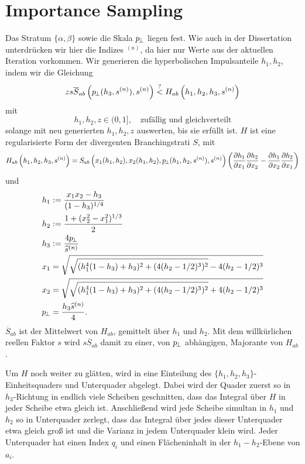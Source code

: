 \section{Importance Sampling}\label{sec:all:alg:imp}
Das Stratum $\{\alpha,\beta\}$ sowie die Skala $p_{\!\perp}$ liegen fest. Wie auch in der Dissertation unterdrücken wir hier die Indizes $^{(n)}$, da hier nur Werte aus der aktuellen Iteration vorkommen. Wir generieren die hyperbolischen Impulsanteile $h_1,h_2$, indem wir die Gleichung
\begin{equation}
  zs\overline{S}_{ab}\left(p_{\!\perp}(h_3,s^{(n)}),s^{(n)}\right)\overset{?}{<}H_{ab}\left(h_1,h_2,h_3,s^{(n)}\right)
\end{equation}
mit
\begin{equation}
  h_1,h_2,z\in(0,1],\quad \text{zufällig und gleichverteilt}
\end{equation}
solange mit neu generierten $h_1,h_2,z$ auswerten, bis sie erfüllt ist. $H$ ist eine regularisierte Form der divergenten Branchingstrati $S$, mit
\begin{equation}
  H_{ab}\left(h_1,h_2,h_3,s^{(n)}\right)=S_{ab}\left(x_1(h_1,h_2),x_2(h_1,h_2),p_{\!\perp}(h_1,h_2,s^{(n)}),s^{(n)}\right)\left(\frac{\partial h_1}{\partial x_1}\frac{\partial h_2}{\partial x_2}-\frac{\partial h_1}{\partial x_2}\frac{\partial h_2}{\partial x_1}\right)
\end{equation}
und
\begin{align}\label{eq:all:imp:trafo}
  h_1&:=\frac{x_1x_2 - h_3}{(1 - h_3)^{1/4}}\\
  h_2&:=\frac{1+(x_2^2 - x_1^2)^{1/3}}{2}\\
  h_3&:=\frac{4p_{\!\perp}}{\widehat{s}^{(n)}}\\
  x_1&=\sqrt{\sqrt{(h_1^4(1-h_3)+h_3)^2+(4(h_2-1/2)^3)^2}-4(h_2-1/2)^3}\\
  x_2&=\sqrt{\sqrt{(h_1^4(1-h_3)+h_3)^2+(4(h_2-1/2)^3)^2}+4(h_2-1/2)^3}\\
  p_{\!\perp}&=\frac{h_3\widehat{s}^{(n)}}{4}.
\end{align}
$\overline{S}_{ab}$ ist der Mittelwert von $H_{ab}$, gemittelt über $h_1$ und $h_2$. Mit dem willkürlichen reellen Faktor $s$ wird $s\overline{S}_{ab}$ damit zu einer, von $p_{\!\perp}$ abhängigen, Majorante von $H_{ab}$.

Um $H$ noch weiter zu glätten, wird in  eine Einteilung des $\{h_1,h_2,h_3\}$-Einheits\-quaders und Unterquader abgelegt. Dabei wird der Quader zuerst so in $h_3$-Richtung in endlich viele Scheiben geschnitten, dass das Integral über $H$ in jeder Scheibe etwa gleich ist. Anschließend wird jede Scheibe simultan in $h_1$ und $h_2$ so in Unterquader zerlegt, dass das Integral über jedes dieser Unterquader etwa gleich groß ist und die Varianz in jedem Unterquader klein wird. Jeder Unterquader hat einen Index $q_i$ und einen Flächeninhalt in der $h_1-h_2$-Ebene von $a_i$.

